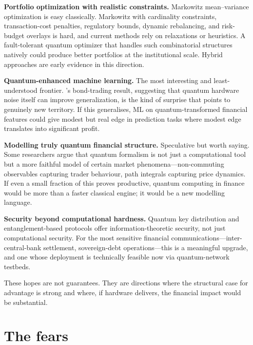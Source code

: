 \textbf{Portfolio optimization with realistic constraints.} Markowitz mean--variance optimization is easy classically. Markowitz with cardinality constraints, transaction-cost penalties, regulatory bounds, dynamic rebalancing, and risk-budget overlays is hard, and current methods rely on relaxations or heuristics. A fault-tolerant quantum optimizer that handles such combinatorial structures natively could produce better portfolios at the institutional scale. Hybrid approaches \citep{morapakula_end--end_2026} are early evidence in this direction.

\textbf{Quantum-enhanced machine learning.} The most interesting and least-understood frontier. \citet{ciceri_enhanced_2025}'s bond-trading result, suggesting that quantum hardware noise itself can improve generalization, is the kind of surprise that points to genuinely new territory. If this generalises, ML on quantum-transformed financial features could give modest but real edge in prediction tasks where modest edge translates into significant profit.

\textbf{Modelling truly quantum financial structure.} Speculative but worth saying. Some researchers \citep{schaden_quantum_2002} argue that quantum formalism is not just a computational tool but a more faithful model of certain market phenomena---non-commuting observables capturing trader behaviour, path integrals capturing price dynamics. If even a small fraction of this proves productive, quantum computing in finance would be more than a faster classical engine; it would be a new modelling language.

\textbf{Security beyond computational hardness.} Quantum key distribution and entanglement-based protocols offer information-theoretic security, not just computational security. For the most sensitive financial communications---inter-central-bank settlement, sovereign-debt operations---this is a meaningful upgrade, and one whose deployment is technically feasible now via quantum-network testbeds.

These hopes are not guarantees. They are directions where the structural case for advantage is strong and where, if hardware delivers, the financial impact would be substantial.

\section{The fears}

